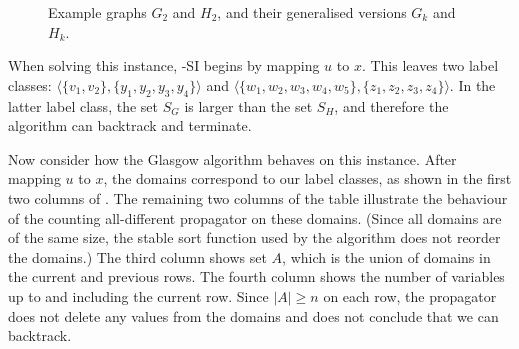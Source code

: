\begin{figure}[htb]
{{        }
        \label{figure:gac-example-1}
    }
    \caption{Example graphs $G_2$ and $H_2$, and their generalised
    versions $G_k$ and $H_k$.}\label{figure:gac-example}
\end{figure}

When solving this instance, \McSplit-SI begins by mapping $u$ to $x$.  This leaves
two label classes:
$\langle \{v_1,v_2\}, \{y_1,y_2,y_3,y_4\} \rangle$
and
$\langle \{w_1,w_2,w_3,w_4,w_5\}, \{z_1,z_2,z_3,z_4\} \rangle$.  In the latter
label class, the set $S_G$ is larger than the set $S_H$, and therefore the
algorithm can backtrack and terminate.

Now consider how the Glasgow algorithm behaves on this instance. After mapping
$u$ to $x$, the domains correspond to our label classes, as shown in the first two
columns of .  The remaining two columns of the table
illustrate the behaviour of the counting all-different propagator on these domains.
(Since all domains are of the same size, the stable sort function used by the algorithm
does not reorder the domains.)  The third column shows set $A$, which is the union
of domains in the current and previous rows.  The fourth column shows the number
of variables up to and including the current row.  Since $|A| \geq n$ on each row,
the propagator does not delete any values from the domains and does not conclude
that we can backtrack.

